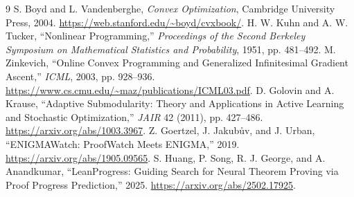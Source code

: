\documentclass[11pt]{article}
\begin{document}
\begin{thebibliography}{9}
 S. Boyd and L. Vandenberghe, \emph{Convex Optimization}, Cambridge University Press, 2004. \url{https://web.stanford.edu/~boyd/cvxbook/}.
 H. W. Kuhn and A. W. Tucker, ``Nonlinear Programming,'' \emph{Proceedings of the Second Berkeley Symposium on Mathematical Statistics and Probability}, 1951, pp. 481--492.
 M. Zinkevich, ``Online Convex Programming and Generalized Infinitesimal Gradient Ascent,'' \emph{ICML}, 2003, pp. 928--936. \url{https://www.cs.cmu.edu/~maz/publications/ICML03.pdf}.
 D. Golovin and A. Krause, ``Adaptive Submodularity: Theory and Applications in Active Learning and Stochastic Optimization,'' \emph{JAIR} 42 (2011), pp. 427--486. \url{https://arxiv.org/abs/1003.3967}.
 Z. Goertzel, J. Jakub\r{u}v, and J. Urban, ``ENIGMAWatch: ProofWatch Meets ENIGMA,'' 2019. \url{https://arxiv.org/abs/1905.09565}.
 S. Huang, P. Song, R. J. George, and A. Anandkumar, ``LeanProgress: Guiding Search for Neural Theorem Proving via Proof Progress Prediction,'' 2025. \url{https://arxiv.org/abs/2502.17925}.
\end{thebibliography}
\end{document}
